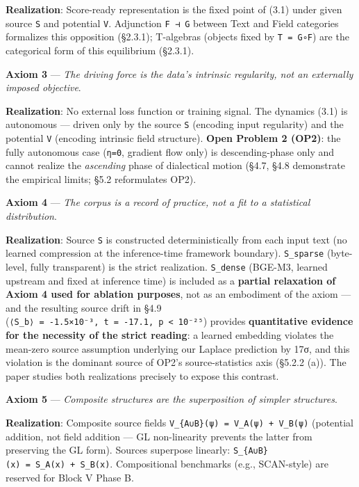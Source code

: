 \documentclass[
]{article}
\begin{document}
\textbf{Realization}: Score-ready representation is the fixed point of
(3.1) under given source \texttt{S} and potential \texttt{V}. Adjunction
\texttt{F\ ⊣\ G} between Text and Field categories formalizes this
opposition (§2.3.1); T-algebras (objects fixed by \texttt{T\ =\ G∘F})
are the categorical form of this equilibrium (§2.3.1).

\textbf{Axiom 3} --- \emph{The driving force is the data's intrinsic
regularity, not an externally imposed objective}.

\textbf{Realization}: No external loss function or training signal. The
dynamics (3.1) is autonomous --- driven only by the source \texttt{S}
(encoding input regularity) and the potential \texttt{V} (encoding
intrinsic field structure). \textbf{Open Problem 2 (OP2)}: the fully
autonomous case (\texttt{η=0}, gradient flow only) is descending-phase
only and cannot realize the \emph{ascending} phase of dialectical motion
(§4.7, §4.8 demonstrate the empirical limits; §5.2 reformulates OP2).

\textbf{Axiom 4} --- \emph{The corpus is a record of practice, not a fit
to a statistical distribution}.

\textbf{Realization}: Source \texttt{S} is constructed deterministically
from each input text (no learned compression at the inference-time
framework boundary). \texttt{S\_sparse} (byte-level, fully transparent)
is the strict realization. \texttt{S\_dense} (BGE-M3, learned upstream
and fixed at inference time) is included as a \textbf{partial relaxation
of Axiom 4 used for ablation purposes}, not as an embodiment of the
axiom --- and the resulting source drift in §4.9
(\texttt{⟨S\_b⟩\ =\ -1.5×10⁻³,\ t\ =\ -17.1,\ p\ \textless{}\ 10⁻²⁵})
provides \textbf{quantitative evidence for the necessity of the strict
reading}: a learned embedding violates the mean-zero source assumption
underlying our Laplace prediction by 17σ, and this violation is the
dominant source of OP2's source-statistics axis (§5.2.2 (a)). The paper
studies both realizations precisely to expose this contrast.

\textbf{Axiom 5} --- \emph{Composite structures are the superposition of
simpler structures}.

\textbf{Realization}: Composite source fields
\texttt{V\_\{A∪B\}(ψ)\ =\ V\_A(ψ)\ +\ V\_B(ψ)} (potential addition, not
field addition --- GL non-linearity prevents the latter from preserving
the GL form). Sources superpose linearly:
\texttt{S\_\{A∪B\}(x)\ =\ S\_A(x)\ +\ S\_B(x)}. Compositional benchmarks
(e.g., SCAN-style) are reserved for Block V Phase B.
\end{document}
